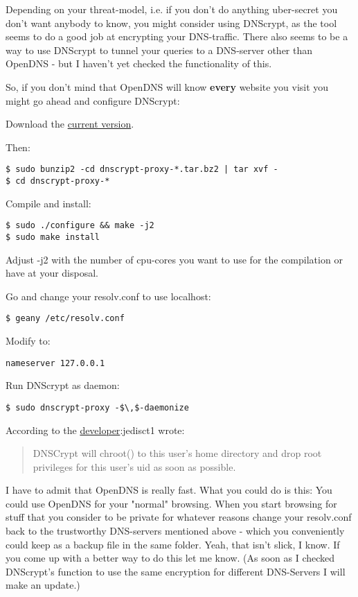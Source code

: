 \documentclass{article}
\begin{document}
 Depending on your threat-model, i.e. if you don't do anything uber-secret you don't want anybody to know, you might consider using DNScrypt, as the tool seems to do a good job at encrypting your DNS-traffic. There also seems to be a way to use DNScrypt to tunnel your queries to a DNS-server other than OpenDNS - but I haven't yet checked the functionality of this. 


 So, if you don't mind that OpenDNS will know \textbf{every} website you visit you might go ahead and configure DNScrypt:


 Download the \href{http://download.dnscrypt.org/dnscrypt-proxy/}{current version}.


 Then:
\begin{lstlisting}
$ sudo bunzip2 -cd dnscrypt-proxy-*.tar.bz2 | tar xvf -
$ cd dnscrypt-proxy-*
\end{lstlisting}



 Compile and install:
\begin{lstlisting}
$ sudo ./configure && make -j2
$ sudo make install
\end{lstlisting}



 Adjust -j2 with the number of cpu-cores you want to use for the compilation or have at your disposal.


 Go and change your resolv.conf to use localhost:
\begin{lstlisting}
$ geany /etc/resolv.conf
\end{lstlisting}



 Modify to:
\begin{lstlisting}
nameserver 127.0.0.1
\end{lstlisting}



 Run DNScrypt as daemon:
\begin{lstlisting}
$ sudo dnscrypt-proxy -$\,$-daemonize
\end{lstlisting}



 According to the \href{http://dnscrypt.org/}{developer}:{\sc jedisct1 wrote:}\begin{quotation}


 DNSCrypt will chroot() to this user's home directory and drop root privileges for this user's uid as soon as possible.\end{quotation}


 I have to admit that OpenDNS is really fast. What you could do is this: You could use OpenDNS for your "normal" browsing. When you start browsing for stuff that you consider to be private for whatever reasons change your resolv.conf back to the trustworthy DNS-servers mentioned above - which you conveniently could keep as a backup file in the same folder. Yeah, that isn't slick, I know. If you come up with a better way to do this let me know. (As soon as I checked DNScrypt's function to use the same encryption for different DNS-Servers I will make an update.)
\end{document}
